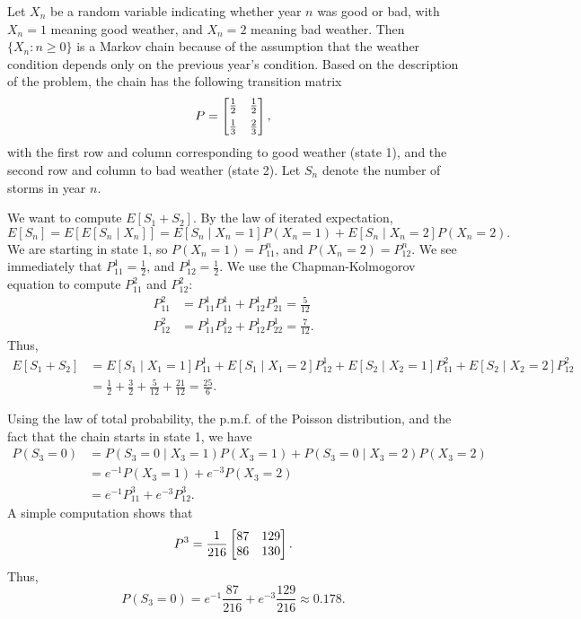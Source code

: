 \documentclass{homework}
\begin{document}
	Let $X_n$ be a random variable indicating whether year $n$ was good or bad, with $X_n = 1$ meaning good weather, and $X_n = 2$ meaning bad weather. Then $\{X_n : n \ge 0\}$ is a Markov chain because of the assumption that the weather condition depends only on the previous year's condition. Based on the description of the problem, the chain has the following transition matrix
	\begin{equation*}
		P = \left[\begin{matrix}\frac{1}{2} & \frac{1}{2} \\[0.5em] \frac{1}{3} & \frac{2}{3}\end{matrix}\right],
	\end{equation*}
	with the first row and column corresponding to good weather (state 1), and the second row and column to bad weather (state 2). Let $S_n$ denote the number of storms in year $n$.
	
	\begin{alphaparts}
		\questionpart We want to compute $E[S_1 + S_2]$. By the law of iterated expectation,
		\begin{equation*}
			E[S_n] = E[E[S_n \mid X_n]] = E[S_n\mid X_n=1]P(X_n=1) + E[S_n \mid X_n=2]P(X_n=2).
		\end{equation*}
		We are starting in state 1, so $P(X_n = 1) = P^n_{11}$, and $P(X_n =2) = P^n_{12}$. We see immediately that $P^1_{11} = \frac{1}{2}$, and $P^1_{12} = \frac{1}{2}$. We use the Chapman-Kolmogorov equation to compute $P^2_{11}$ and $P^2_{12}$:
		\begin{align*}
			P^2_{11} &= P^1_{11}P^1_{11} + P^1_{12}P^1_{21} = \frac{5}{12} \\
			P^2_{12} &= P^1_{11}P^1_{12} + P^1_{12}P^1_{22} = \frac{7}{12}.
		\end{align*}
		Thus,
		\begin{align*}
			E[S_1 + S_2] &= E[S_1 \mid X_1=1]P^1_{11} + E[S_1 \mid X_1=2]P^1_{12} + E[S_2 \mid X_2 = 1]P^2_{11} + E[S_2 \mid X_2 = 2]P^2_{12} \\
			&= \frac{1}{2} + \frac{3}{2} + \frac{5}{12} + \frac{21}{12} = \frac{25}{6}.
		\end{align*}
		
		\questionpart Using the law of total probability, the p.m.f. of the Poisson distribution, and the fact that the chain starts in state 1, we have
		\begin{align*}
			P(S_3=0) &= P(S_3 = 0 \mid X_3 = 1)P(X_3=1) + P(S_3=0 \mid X_3 = 2)P(X_3 = 2) \\
			&= e^{-1}P(X_3=1) + e^{-3}P(X_3=2) \\
			&= e^{-1}P^3_{11} + e^{-3}P^3_{12}.
		\end{align*}
		A simple computation shows that
		\begin{equation*}
			P^3 = \frac{1}{216}\left[\begin{matrix}87 & 129 \\ 86 & 130\end{matrix}\right].
		\end{equation*}
		Thus,
		\begin{equation*}
			P(S_3=0)= e^{-1}\frac{87}{216}+ e^{-3}\frac{129}{216} \approx 0.178.
		\end{equation*}
		

\end{alphaparts}
\end{document}
